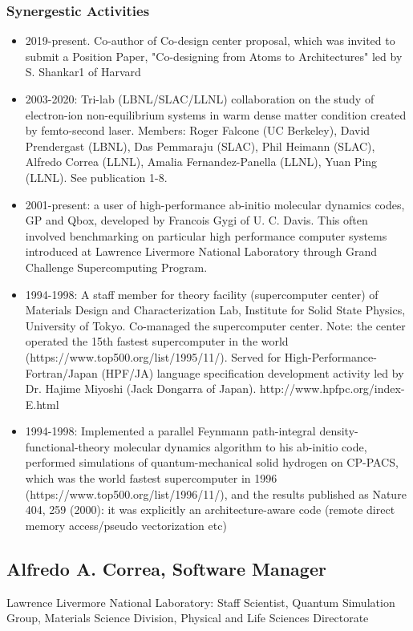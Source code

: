 \subsubsection*{Synergestic Activities}
\begin{itemize}
    \item 2019-present. Co-author of Co-design center proposal, which was invited to submit a Position Paper, "Co-designing from Atoms to Architectures" led by S. Shankar1 of Harvard
    \item 2003-2020: Tri-lab (LBNL/SLAC/LLNL) collaboration on the study of electron-ion non-equilibrium systems in warm dense matter condition created by femto-second laser. Members: Roger Falcone (UC Berkeley), David Prendergast (LBNL), Das Pemmaraju (SLAC), Phil Heimann (SLAC), Alfredo Correa (LLNL), Amalia Fernandez-Panella (LLNL), Yuan Ping (LLNL).  See publication 1-8.
    \item 2001-present: a user of high-performance ab-initio molecular dynamics codes, GP and Qbox, developed by Francois Gygi of U. C. Davis. This often involved benchmarking on particular high performance computer systems introduced at Lawrence Livermore National Laboratory through Grand Challenge Supercomputing Program.  
    \item 1994-1998: A staff member for theory facility (supercomputer center) of Materials Design and Characterization Lab, Institute for Solid State Physics, University of Tokyo. Co-managed the supercomputer center. Note: the center operated the 15th fastest supercomputer in the world (https://www.top500.org/list/1995/11/). Served for High-Performance-Fortran/Japan (HPF/JA) language specification development activity led by Dr. Hajime Miyoshi (Jack Dongarra of Japan). http://www.hpfpc.org/index-E.html
    \item 1994-1998: Implemented a parallel Feynmann path-integral density-functional-theory molecular dynamics algorithm to his ab-initio code, performed simulations of quantum-mechanical solid hydrogen on CP-PACS, which was the world fastest supercomputer in 1996 (https://www.top500.org/list/1996/11/), and the results published as Nature 404, 259 (2000): it was explicitly an architecture-aware code (remote direct memory access/pseudo vectorization etc)
\end{itemize}
\clearpage


\subsection*{Alfredo A. Correa, Software Manager}
Lawrence Livermore National Laboratory: Staff Scientist, Quantum Simulation Group, Materials Science Division, Physical and Life Sciences Directorate

